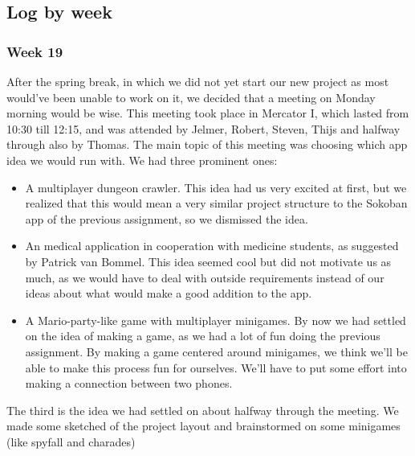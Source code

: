 \documentclass[../main.tex]{subfiles}
\begin{document}
\pagebreak
\subsection{Log by week}
\subsubsection*{Week 19}
After the spring break, in which we did not yet start our new project as most would've been unable to work on it, we decided that a meeting on Monday morning would be wise. This meeting took place in Mercator I, which lasted from 10:30 till 12:15, and was attended by Jelmer, Robert, Steven, Thijs and halfway through also by Thomas.
The main topic of this meeting was choosing which app idea we would run with. We had three prominent ones:
\begin{itemize}
	\item A multiplayer dungeon crawler. This idea had us very excited at first, but we realized that this would mean a very similar project structure to the Sokoban app of the previous assignment, so we dismissed the idea.
	\item An medical application in cooperation with medicine students, as suggested by Patrick van Bommel. This idea seemed cool but did not motivate us as much, as we would have to deal with outside requirements instead of our ideas about what would make a good addition to the app.
	\item A Mario-party-like game with multiplayer minigames. By now we had settled on the idea of making a game, as we had a lot of fun doing the previous assignment. By making a game centered around minigames, we think we'll be able to make this process fun for ourselves. We'll have to put some effort into making a connection between two phones.
\end{itemize}

The third is the idea we had settled on about halfway through the meeting. We made some sketched of the project layout and brainstormed on some minigames (like spyfall and charades)
\end{document}
